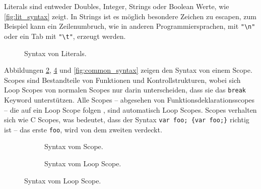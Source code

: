       Literals sind entweder Doubles, Integer, Strings oder Boolean Werte, wie \autoref{fig:lit_syntax} zeigt. In Strings ist es möglich besondere Zeichen zu escapen, zum Beispiel kann ein Zeilenumbruch, wie in anderen Programmiersprachen, mit \lstinline[style=MyMacroStyleIn]$"\n"$ oder ein Tab mit \lstinline[style=MyMacroStyleIn]$"\t"$, erzeugt werden.
      \begin{figure}[H]
        \centering
        \caption{Syntax von Literals.}
        \label{fig:lit_syntax}
      \end{figure}

      Abbildungen \ref{fig:scope_syntax}, \ref{fig:loop_scope_syntax} und \ref{fig:common_syntax} zeigen den Syntax von einem Scope. Scopes sind Bestandteile von Funktionen und Kontrollstrukturen, wobei sich Loop Scopes von normalen Scopes nur darin unterscheiden, dass sie das \lstinline[style=MyMacroStyleIn]$break$ Keyword unterstützen. Alle Scopes -- abgesehen von Funktionsdeklarationsscopes --
      die auf ein Loop Scope folgen %
      , sind automatisch Loop Scopes. Scopes verhalten sich wie C Scopes, was bedeutet, dass der Syntax \lstinline[style=MyMacroStyleIn]$var foo; {var foo;}$ richtig ist -- das erste \lstinline[style=MyMacroStyleIn]$foo$, wird von dem zweiten verdeckt.
      \begin{figure}[H]
        \centering
        \begin{minipage}{.45\textwidth}
          \vspace*{2.45em}
          \begin{figure}[H]
            \centering
            \caption{Syntax vom Scope.}
            \label{fig:scope_syntax}
          \end{figure}
        \end{minipage}%
        \begin{minipage}{.45\textwidth}
          \begin{figure}[H]
            \centering
            \caption{Syntax vom Loop Scope.}
            \label{fig:loop_scope_syntax}
          \end{figure}
        \end{minipage}
      \end{figure}

